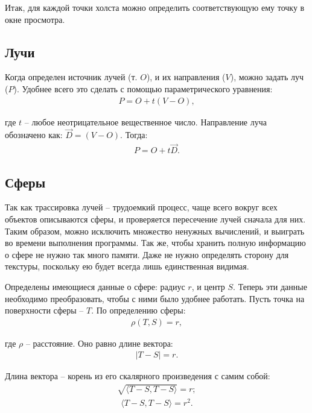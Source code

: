 Итак, для каждой точки холста можно определить соответствующую ему точку в окне просмотра.

\subsection{Лучи}

Когда определен источник лучей (т. $O$), и их направления ($V$), можно задать луч ($P$). Удобнее всего это сделать с помощью параметрического уравнения:
\begin{gather}
	P = O+t(V-O),
\end{gather}

где $t$ – любое неотрицательное вещественное число. Направление луча обозначено как: $\vec{D}=(V-O)$. Тогда:
\begin{gather}
	P = O+t\vec{D}.
\end{gather}

\subsection{Сферы}

Так как трассировка лучей – трудоемкий процесс, чаще всего вокруг всех объектов описываются сферы, и проверяется пересечение лучей сначала для них. Таким образом, можно исключить множество ненужных вычислений, и выиграть во времени выполнения программы. Так же, чтобы хранить полную информацию о сфере не нужно так много памяти. Даже не нужно определять сторону для текстуры, поскольку ею будет всегда лишь единственная видимая.

Определены имеющиеся данные о сфере: радиус $r$, и центр $S$. Теперь эти данные необходимо преобразовать, чтобы с ними было удобнее работать. Пусть точка на поверхности сферы -- $T$. По определению сферы:
\begin{gather}
	\rho(T, S) = r,
\end{gather}

где $\rho$ -- расстояние. Оно равно длине вектора:
\begin{gather}
	|T-S| = r.
\end{gather}

Длина вектора -- корень из его скалярного произведения с самим собой:
\begin{gather}
	\sqrt{\langle T-S, T-S \rangle} = r;
\end{gather}
\begin{gather}
	\langle T-S, T-S \rangle = r^2.
\end{gather}


